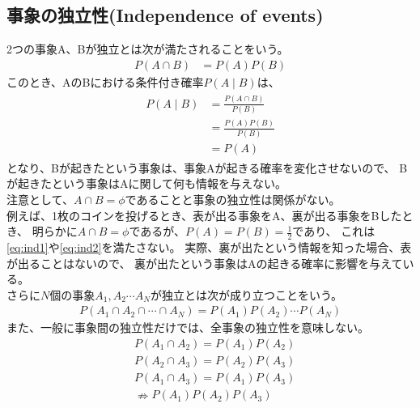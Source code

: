 \documentclass[a4j]{jarticle}
\begin{document}
\subsection{事象の独立性(Independence of events)}
2つの事象A、Bが独立とは次が満たされることをいう。
\begin{align}
    P(A \cap B) &= P(A)P(B) \label{eq:ind1}
\end{align}
このとき、AのBにおける条件付き確率$P(A \mid B)$は、
\begin{align}
    \begin{aligned}
    P(A \mid B) &= \frac{P(A \cap B)}{P(B)} \\
    &= \frac{P(A)P(B)}{P(B)} \\
    &= P(A)
    \label{eq:ind2}
    \end{aligned}
\end{align}
となり、Bが起きたという事象は、事象Aが起きる確率を変化させないので、
Bが起きたという事象はAに関して何も情報を与えない。\\ 
注意として、$A \cap B = \phi$であることと事象の独立性は関係がない。\\
例えば、1枚のコインを投げるとき、表が出る事象をA、裏が出る事象をBしたとき、
明らかに$A \cap B = \phi$であるが、$P(A) = P(B) = \frac{1}{2}$であり、
これは\eqref{eq:ind1}や\eqref{eq:ind2}を満たさない。
実際、裏が出たという情報を知った場合、表が出ることはないので、
裏が出たという事象はAの起きる確率に影響を与えている。\\
さらに$N$個の事象$A_{1},A_{2} \cdots A_{N}$が独立とは次が成り立つことをいう。
\begin{align}
    P(A_{1} \cap A_{2} \cap \cdots \cap A_{N}) = P(A_{1})P(A_{2}) \cdots P(A_{N})
\end{align}
また、一般に事象間の独立性だけでは、全事象の独立性を意味しない。
\begin{align}
    &P(A_{1} \cap A_{2})=P(A_{1})P(A_{2}) \\ 
    &P(A_{2} \cap A_{3})=P(A_{2})P(A_{3}) \\
    &P(A_{1} \cap A_{3})=P(A_{1})P(A_{3}) \\ 
    &\nRightarrow P(A_{1})P(A_{2})P(A_{3})
\end{align}
\end{document}
